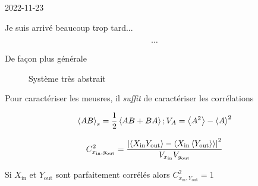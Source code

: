 


2022-11-23

Je suis arrivé beaucoup trop tard...


\[ \dotsb \]


De façon plus générale



\begin{figure}[ht]
    \centering
    \caption{Système très abstrait}
    \label{fig:système-très-abstrait}
\end{figure}


Pour caractériser les meusres, il \textit{suffit} de caractériser les corrélations


\[ \expval{AB}_s = \frac{1}{2} \expval{AB + BA}; V_A = \expval{A^2}- \expval{A}^2 \]


\[ C_{x_{\text{in}},y_{\text{out}}}^2 = \frac{\abs{\expval{X_{\text{in}} Y_{\text{out}} }- \expval{X_{\text{in}}		\expval{Y_{\text{out}} }  }}^{2}}{V_{x_{\text{in}}} V_{y_{\text{out}} }  }    \]



Si $X_{\text{in}} $ et $Y_{\text{out}}  $ sont parfaitement corrélés alors $C_{x_{\text{in}},Y_{\text{out}}}^2 = 1  $



